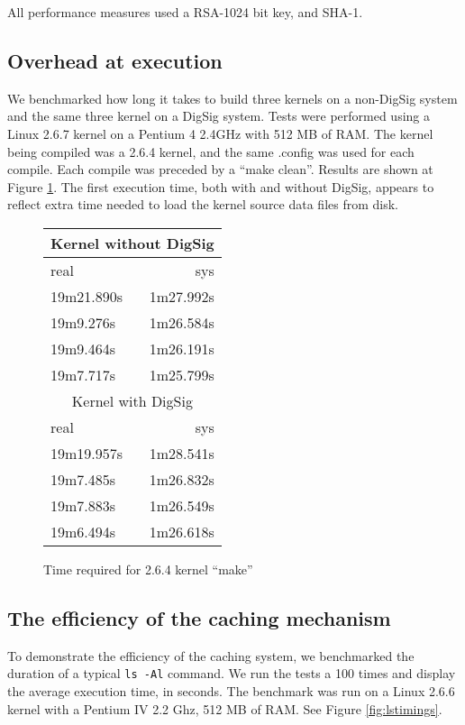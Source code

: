 \documentclass{article}
\begin{document}
All performance measures used a RSA-1024 bit key, and SHA-1.

\subsection{Overhead at execution}

We benchmarked how long it takes to build three kernels on a non-DigSig system
and the same three kernel on a DigSig system. Tests were performed 
using a Linux 2.6.7 kernel on a Pentium 4 2.4GHz with 512 MB of RAM.  
The kernel being compiled was a 2.6.4 kernel, and the same .config was used for each compile.  
Each compile was preceded by a ``make clean''.  Results are shown at Figure
\ref{fig:kerntiming}. The
first execution time, both with and without DigSig, appears to reflect extra
time needed to load the kernel source data files from disk.

\begin{figure}
\begin{center}
\begin{tabular}{|l|r|}
\hline
\multicolumn{2}{|c|}{Kernel without DigSig} \\
\hline
	real & sys \\
	19m21.890s & 1m27.992s \\
	19m9.276s & 1m26.584s \\
	19m9.464s & 1m26.191s \\
	19m7.717s & 1m25.799s \\
\hline
	\multicolumn{2}{|c|}{Kernel with DigSig} \\
\hline
	real & sys \\
	19m19.957s & 1m28.541s \\
	19m7.485s & 1m26.832s \\
	19m7.883s & 1m26.549s \\
	19m6.494s & 1m26.618s \\
\hline
\end{tabular}
\caption{Time required for 2.6.4 kernel ``make'' }
\label{fig:kerntiming}
\end{center}
\end{figure}

\subsection{The efficiency of the caching mechanism}

To demonstrate the efficiency of the caching system, we benchmarked
the duration of a typical \texttt{ls -Al} command. We run the tests 
a 100 times and display the average execution time, in seconds.
The benchmark was run on a Linux 2.6.6 kernel
with a Pentium IV 2.2 Ghz, 512 MB of RAM. See Figure \ref{fig:lstimings}.
\end{document}
